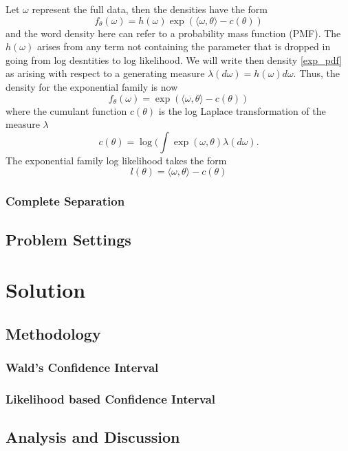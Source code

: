 \documentclass[11pt]{extarticle}
\begin{document}
Let $\omega$ represent the full data, then the densities have the form
\begin{equation}\label{exp_pdf}
    f_{\theta}(\omega) = h(\omega)\exp(\langle\omega,\theta\rangle-c(\theta))
\end{equation}
and the word density here can refer to a probability mass function (PMF). The $h(\omega)$ arises from any term not containing the parameter that is dropped in going from log desntities to log likelihood.
We will write then density \ref{exp_pdf} as arising with respect to a generating measure $\lambda(d\omega)=h(\omega)d\omega$. Thus, the density for the exponential family is now
$$f_{\theta}(\omega) = \exp(\langle\omega,\theta\rangle-c(\theta))$$
where the cumulant function $c(\theta)$ is the log Laplace transformation of the measure $\lambda$
$$c(\theta)=\log(\int \exp(\omega,\theta)\lambda(d\omega).$$
The exponential family log likelihood takes the form 
\begin{equation}\label{exp_ll2}
    l(\theta)=\langle\omega,\theta\rangle-c(\theta)
\end{equation}




\subsubsection{Complete Separation}

\subsection{Problem Settings}

\section{Solution}
\subsection{Methodology}
\subsubsection{Wald's Confidence Interval}
\subsubsection{Likelihood based Confidence Interval}

\subsection{Analysis and Discussion}
\end{document}
